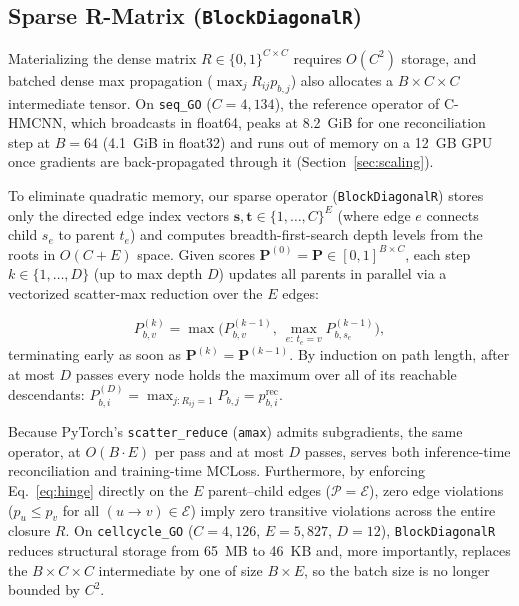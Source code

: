\documentclass[conference]{IEEEtran}
\begin{document}
\subsection{Sparse R-Matrix (\texttt{BlockDiagonalR})}
{\sloppy{}
Materializing the dense matrix $R \in \{0,1\}^{C\times C}$ requires $O(C^2)$
storage, and batched dense max propagation ($\max_j R_{ij} p_{b,j}$) also
allocates a $B\times C\times C$ intermediate tensor. On \texttt{seq\_GO}
($C = 4{,}134$), the reference operator of C-HMCNN, which broadcasts in
float64, peaks at 8.2~GiB for one reconciliation step at $B=64$ (4.1~GiB in
float32) and runs out of memory on a 12~GB GPU once gradients are
back-propagated through it (Section~\ref{sec:scaling}).\par}

{\sloppy{}
To eliminate quadratic memory, our sparse operator (\texttt{BlockDiagonalR})
stores only the directed edge index vectors $\mathbf{s}, \mathbf{t} \in
\{1,\dots,C\}^E$ (where edge $e$ connects child $s_e$ to parent $t_e$) and
computes breadth-first-search depth levels from the roots in $O(C{+}E)$
space. Given scores $\mathbf{P}^{(0)} = \mathbf{P} \in [0,1]^{B\times C}$,
each step $k \in \{1,\dots,D\}$ (up to max depth $D$) updates all
parents in parallel via a vectorized scatter-max reduction over the $E$ edges:\par}
\begin{equation}
P^{(k)}_{b,v} = \max\Big(P^{(k-1)}_{b,v},\ \max_{e:\,t_e = v} P^{(k-1)}_{b,s_e}\Big),
\label{eq:sparse_step}
\end{equation}
terminating early as soon as $\mathbf{P}^{(k)} = \mathbf{P}^{(k-1)}$. By
induction on path length, after at most $D$ passes every node holds the maximum
over all of its reachable descendants: $P^{(D)}_{b,i} = \max_{j:R_{ij}=1}
P_{b,j} = p_{b,i}^{\text{rec}}$.

Because PyTorch's \texttt{scatter\_reduce} (\texttt{amax}) admits subgradients,
the same operator, at $O(B\cdot E)$ per pass and at most $D$ passes, serves both inference-time
reconciliation and training-time MCLoss. Furthermore, by enforcing
Eq.~\eqref{eq:hinge} directly on the $E$ parent--child edges ($\mathcal{P} =
\mathcal{E}$), zero edge violations ($p_u \le p_v$ for all $(u\rightarrow v)\in
\mathcal{E}$) imply zero transitive violations across the entire closure $R$.
On \texttt{cellcycle\_GO} ($C=4{,}126$, $E=5{,}827$, $D=12$),
\texttt{BlockDiagonalR} reduces structural storage from 65~MB to 46~KB
and, more importantly, replaces the $B\times C\times C$ intermediate by
one of size $B\times E$, so the batch size is no longer bounded by $C^2$.
\end{document}
